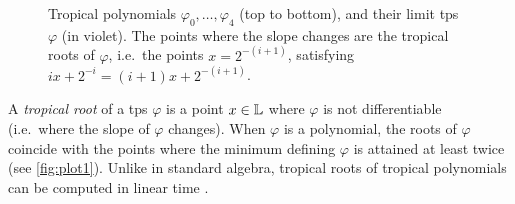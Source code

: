 \begin{wrapfigure}{r}{0.5\textwidth}%
\caption{\small Tropical polynomials $\varphi_0,\dots,\varphi_4$ (top to bottom), and their limit tps $\varphi$ (in violet). The points where the slope changes are  the tropical roots of $\varphi$, i.e.~the points $x=2^{-(i+1)}$, satisfying $ix+2^{-i}=(i+1)x+2^{-(i+1)}$.}
\label{fig:plot1}%
\end{wrapfigure} %

A \emph{tropical root} of a tps $\varphi$ is a point $x\in \mathbb{L}$ where $\varphi$ is not differentiable (i.e.~where the slope of $\varphi$ changes). When $\varphi$ is a polynomial, the roots of $\varphi$ coincide with the points where the minimum defining $\varphi$ is attained at least twice (see \autoref{fig:plot1}).
Unlike in standard algebra, tropical roots of tropical polynomials can be computed in linear time \cite{Noferini2015}. 


%


